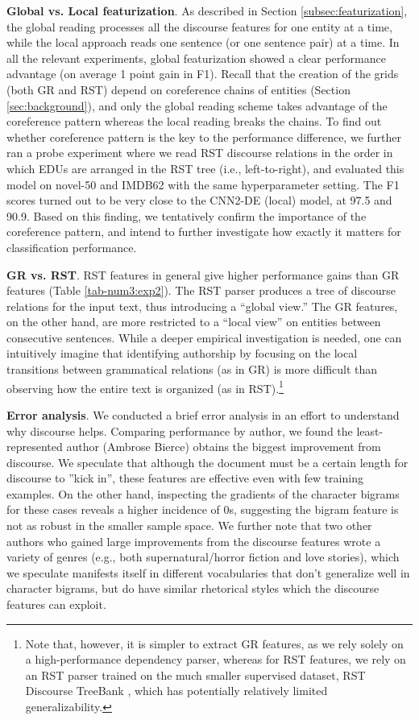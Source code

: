 \noindent
\textbf{Global vs. Local featurization}.
As described in Section \ref{subsec:featurization}, the global reading processes all the discourse features for one entity at a time, while the local approach reads one sentence (or one sentence pair) at a time.
In all the relevant experiments, global featurization showed a clear performance advantage (on average 1 point gain in F1). 
Recall that the creation of the grids (both GR and RST) depend on coreference chains of entities (Section \ref{sec:background}), and only the global reading scheme takes advantage of the coreference pattern whereas the local reading breaks the chains. 
To find out whether coreference pattern is the key to the performance difference, we further ran a probe experiment where we read RST discourse relations in the order in which EDUs are arranged in the RST tree (i.e., left-to-right), and evaluated this model on novel-50 and IMDB62 with the same hyperparameter setting. 
The F1 scores turned out to be very close to the CNN2-DE (local) model, at 97.5 and 90.9.
Based on this finding, we tentatively confirm the importance of the coreference pattern, and intend to further investigate how exactly it matters for classification performance. 
\medskip

\noindent
\textbf{GR vs. RST}.
RST features in general give higher performance gains than GR features (Table \ref{tab-num3:exp2}).
The RST parser produces a tree of discourse relations for the input text, thus introducing a ``global view.''
The GR features, on the other hand, are more restricted to a ``local view'' on entities between consecutive sentences. 
While a deeper empirical investigation is needed, one can intuitively imagine that identifying authorship by focusing on the local transitions between grammatical relations (as in GR) is more difficult than observing how the entire text is organized (as in RST).\footnote{Note that, however, it is simpler to extract GR features, as we rely solely on a high-performance dependency parser, whereas for RST features, we rely on an RST parser trained on the much smaller supervised dataset, RST Discourse TreeBank \cite{Carlson:2002}, which has potentially relatively limited generalizability.}
\medskip

\noindent
\textbf{Error analysis}. We conducted a brief error analysis in an effort to understand why discourse helps. Comparing performance by author, we found the least-represented author (Ambrose Bierce) obtains the biggest improvement from discourse. We speculate that although the document must be a certain length for discourse to ''kick in'', these features are effective even with few training examples. On the other hand, inspecting the gradients of the character bigrams for these cases reveals a higher incidence of 0s, suggesting the bigram feature is not as robust in the smaller sample space. We further note that two other authors who gained large improvements from the discourse features wrote a variety of genres (e.g., both supernatural/horror fiction and love stories), which we speculate manifests itself in different vocabularies that don’t generalize well in character bigrams, but do have similar rhetorical styles which the discourse features can exploit.
